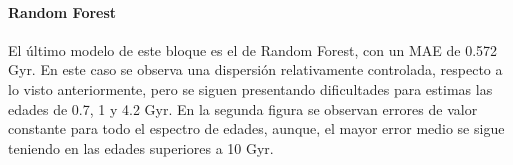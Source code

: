 \paragraph{Random Forest} 
El último modelo de este bloque es el de Random Forest, con un MAE de 0.572 Gyr. En este caso se observa una dispersión relativamente controlada, respecto a lo visto anteriormente, pero se siguen presentando dificultades para estimas las edades de 0.7, 1 y 4.2 Gyr. En la segunda figura se observan errores de valor constante para todo el espectro de edades, aunque, el mayor error medio se sigue teniendo en las edades superiores a 10 Gyr.

\begin{figure}[h]
\begin{minipage}{.35\linewidth}
\centering
{}
\end{minipage}%
\begin{minipage}{.35\linewidth}
\centering
{}

\end{minipage}
\end{figure}
